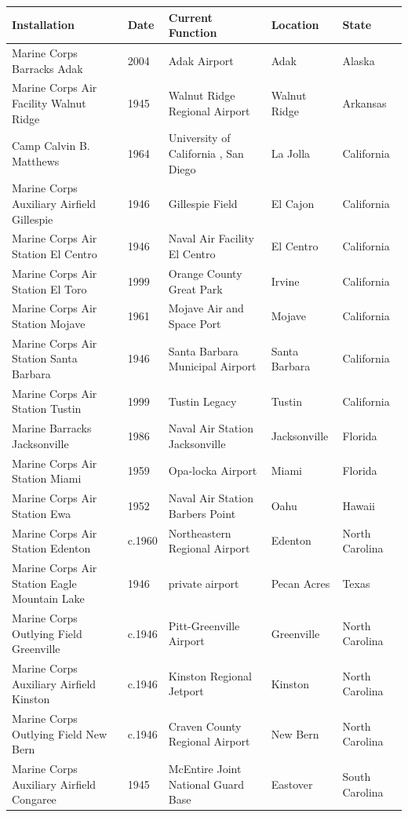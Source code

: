 \documentclass{article}
\begin{document}
\begin{tabular}{lllll}
\toprule
Installation & Date & Current Function & Location & State \\
\midrule
Marine Corps Barracks Adak & 2004 & Adak Airport & Adak & Alaska \\
Marine Corps Air Facility Walnut Ridge & 1945 & Walnut Ridge Regional Airport & Walnut Ridge & Arkansas \\
Camp Calvin B. Matthews & 1964 & University of California , San Diego & La Jolla & California \\
Marine Corps Auxiliary Airfield Gillespie & 1946 & Gillespie Field & El Cajon & California \\
Marine Corps Air Station El Centro & 1946 & Naval Air Facility El Centro & El Centro & California \\
Marine Corps Air Station El Toro & 1999 & Orange County Great Park & Irvine & California \\
Marine Corps Air Station Mojave & 1961 & Mojave Air and Space Port & Mojave & California \\
Marine Corps Air Station Santa Barbara & 1946 & Santa Barbara Municipal Airport & Santa Barbara & California \\
Marine Corps Air Station Tustin & 1999 & Tustin Legacy & Tustin & California \\
Marine Barracks Jacksonville & 1986 & Naval Air Station Jacksonville & Jacksonville & Florida \\
Marine Corps Air Station Miami & 1959 & Opa-locka Airport & Miami & Florida \\
Marine Corps Air Station Ewa & 1952 & Naval Air Station Barbers Point & Oahu & Hawaii \\
Marine Corps Air Station Edenton & c.1960 & Northeastern Regional Airport & Edenton & North Carolina \\
Marine Corps Air Station Eagle Mountain Lake & 1946 & private airport & Pecan Acres & Texas \\
Marine Corps Outlying Field Greenville & c.1946 & Pitt-Greenville Airport & Greenville & North Carolina \\
Marine Corps Auxiliary Airfield Kinston & c.1946 & Kinston Regional Jetport & Kinston & North Carolina \\
Marine Corps Outlying Field New Bern & c.1946 & Craven County Regional Airport & New Bern & North Carolina \\
Marine Corps Auxiliary Airfield Congaree & 1945 & McEntire Joint National Guard Base & Eastover & South Carolina \\
\bottomrule
\end{tabular}
\end{document}
